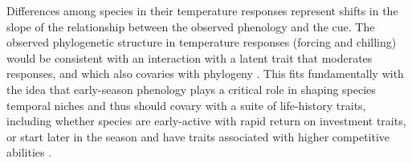 \documentclass[11pt]{article}
\begin{document}
Differences among species in their temperature responses represent shifts in the slope of the relationship between the observed phenology and the cue. The observed phylogenetic structure in temperature responses (forcing and chilling) would be consistent with an interaction with a latent trait that moderates responses, and which also covaries with phylogeny \citep{davies2019phylogenetically}. This fits fundamentally with the idea that early-season phenology plays a critical role in shaping species temporal niches \citep{gotelli1996} and thus should covary with a suite of life-history traits, including whether species are early-active with rapid return on investment traits, or start later in the season and have traits associated with higher competitive abilities \citep[e.g.,][]{Grime:1977sw,memegan2021}. %

\end{document}
